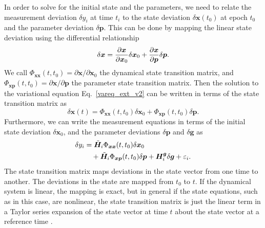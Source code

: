 \documentclass[lineno, pdflatex,sn-mathphys-ay]{sn-jnl}
\theoremstyle{thmstyleone}%
\theoremstyle{thmstyletwo}%
\theoremstyle{thmstylethree}%
\renewcommand{\vec}[1]{\boldsymbol{#1}}
\begin{document}
	In order to solve for the initial state and the parameters, we need to relate the measurement deviation \( \delta {y}_i \) at time \( t_i \) to the state deviation \( \delta \vec{x}(t_0)\) at epoch \( t_0 \) and the parameter deviation \( \delta \vec{p} \). This can be done by mapping the linear state deviation using the differential relationship
	\begin{equation}
	\delta \vec{x} = \pdv{\vec{x}}{\vec{x}_0} \delta \vec{x}_0 + \pdv{\vec{x}}{\vec{p}} \delta \vec{p}.
	\end{equation}
	We call $\Phi_{\vec{xx}}(t, t_0) = \partial\vec{x}/\partial\vec{x}_0$ the dynamical state transition matrix, and $\Phi_{\vec{xp}}(t, t_0) = \partial\vec{x} /\partial \vec{p}$ the parameter state transition matrix.
	Then the solution to the variational equation Eq.~\eqref{vareq_ext_v2} can be written in terms of the state transition matrix as
	\begin{equation}
		\delta\vec{x}(t) = 
		\Phi_{\vec{xx}}(t, t_0) \delta\vec{x}_0 + 
		\Phi_{\vec{xp}}(t, t_0) \delta\vec{p}.
	\end{equation}
	Furthermore, we can write the measurement equations in terms of the initial state deviation $\delta\vec{x}_0$, and the parameter deviations $\delta\vec{p}$ and $\delta\vec{g}$ as
	\begin{subequations}
		\begin{align}\label{eq:22.23_v2}
			\delta{y}_i &= 
			\tilde{\vec{H}}_i	\Phi_{\vec{xx}}(t, t_0) \delta\vec{x}_0 
			\notag\\ &\quad + 
			\tilde{\vec{H}}_i	\Phi_{\vec{xp}}(t, t_0) \delta\vec{p} 
			+ \vec{H}^{\vec{g}}_i \delta\vec{g} 
			+ \varepsilon_i. %
		\end{align}
	\end{subequations}
	The state transition matrix maps deviations in the state vector from one time to another.  The deviations in the state are mapped from $t_0$ to $t$. 
	If the dynamical system is linear, the mapping is exact, but in general if  the state equations, such as in this case, are nonlinear,  the state transition matrix is just the linear term in a Taylor series expansion of the state vector at time $t$ about the state vector at a reference time \citep[see, e.g.,][]{2004sod..book.....T}. %
	
\end{document}
